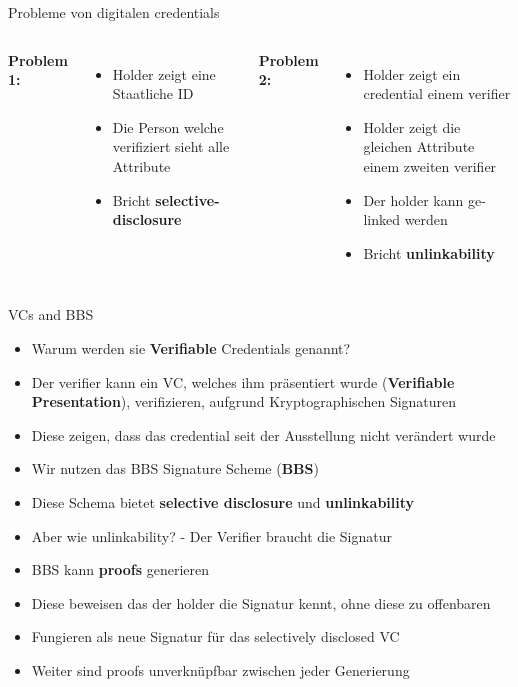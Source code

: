 \documentclass[
	german,%
	authorontitle=true,
	]{bfhbeamer}
\begin{document}
\begin{frame}{Probleme von digitalen credentials}
    \begin{columns}[onlytextwidth,T]
        \column{70mm}  
        \textbf{Problem 1:}
        \begin{itemize}
            \item Holder zeigt eine Staatliche ID
            \item Die Person welche verifiziert sieht alle Attribute
            \item Bricht \textbf{selective-disclosure}
        \end{itemize}

        \column{70mm}  
        \textbf{Problem 2:}
        \begin{itemize}
            \item Holder zeigt ein credential einem verifier
            \item Holder zeigt die gleichen Attribute einem zweiten verifier
            \item Der holder kann ge-linked werden
            \item Bricht \textbf{unlinkability}
        \end{itemize}

    \end{columns}
\end{frame}


\begin{frame}{VCs and BBS}
    \begin{itemize}
        \item Warum werden sie \textbf{Verifiable} Credentials genannt?
        \item Der verifier kann ein VC, welches ihm präsentiert wurde (\textbf{Verifiable Presentation}), verifizieren, aufgrund Kryptographischen Signaturen
        \item Diese zeigen, dass das credential seit der Ausstellung nicht verändert wurde
        \item Wir nutzen das BBS Signature Scheme (\textbf{BBS}) 
        \item Diese Schema bietet \textbf{selective disclosure} und \textbf{unlinkability}
        \item Aber wie unlinkability? - Der Verifier braucht die Signatur
        \item BBS kann \textbf{proofs} generieren
        \item Diese beweisen das der holder die Signatur kennt, ohne diese zu offenbaren
        \item Fungieren als neue Signatur für das selectively disclosed VC
        \item Weiter sind proofs unverknüpfbar zwischen jeder Generierung
    \end{itemize}
\end{frame}
\end{document}
